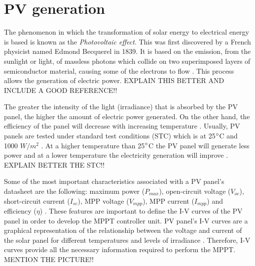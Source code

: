 \section{PV generation}

The phenomenon in which the transformation of solar energy to electrical energy is based is known as the \textit{Photovoltaic effect}. This  was first discovered by a French physicist named Edmond Becquerel in 1839. It is based on the emission, from the sunlight or light, of massless photons which collide on two superimposed layers of semiconductor material, causing some of the electrons to flow \cite{PVeffect}. This process allows the generation of electric power. EXPLAIN THIS BETTER AND INCLUDE A GOOD REFERENCE!!


The greater the intensity of the light (irradiance) that is absorbed by the PV panel, the higher the amount of electric power generated. On the other hand, the efficiency of the panel will decrease with increasing temperature \cite{handbook}. Usually, PV panels are tested under standard test conditions (STC) which is at 25$\dec$C and 1000 $W/ m^2$ \cite{handbook}. At a higher temperature than 25$\dec$C the PV panel will generate less power and at a lower temperature the electricity generation will improve \cite{handbook}. EXPLAIN BETTER THE STC!! %

Some of the most important characteristics associated with a PV panel’s datasheet are the following: maximum power ($P_{max}$), open-circuit voltage ($V_{oc}$), short-circuit current ($I_{sc}$), MPP voltage ($V_{mpp}$), MPP current ($I_{mpp}$) and efficiency ($\eta$) \cite{handbook}.  %
These features are important to define the I-V curves of the PV panel in order to develop the MPPT controller unit. PV panel's I-V curves are a graphical representation of the relationship between the voltage and current of the solar panel for different temperatures and levels of irradiance \cite{IVcurves}. Therefore, I-V curves provide all the necessary information required to perform the MPPT. MENTION THE PICTURE!! %

